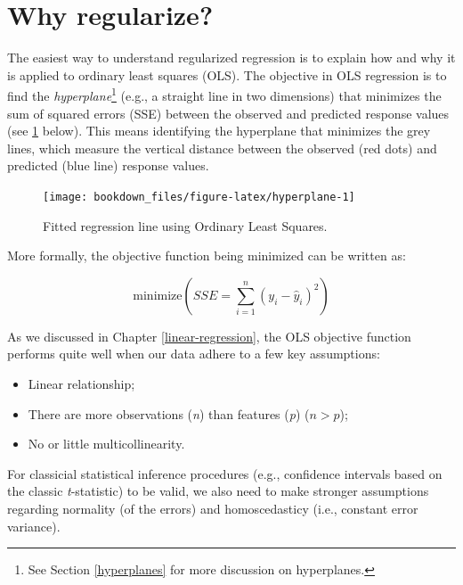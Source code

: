 \documentclass[]{krantz}
\providecommand{\tightlist}{%
  \setlength{\itemsep}{0pt}\setlength{\parskip}{0pt}}
\let\BeginKnitrBlock\begin \let\EndKnitrBlock\end
\begin{document}
\hypertarget{why}{%
\section{Why regularize?}\label{why}}

The easiest way to understand regularized regression is to explain how and why it is applied to ordinary least squares (OLS). The objective in OLS regression is to find the \emph{hyperplane}\footnote{See Section \ref{hyperplanes} for more discussion on hyperplanes.} (e.g., a straight line in two dimensions) that minimizes the sum of squared errors (SSE) between the observed and predicted response values (see \ref{fig:hyperplane} below). This means identifying the hyperplane that minimizes the grey lines, which measure the vertical distance between the observed (red dots) and predicted (blue line) response values.

\begin{figure}

{\centering \texttt{[image: bookdown\_files/figure-latex/hyperplane-1]} 

}

\caption{Fitted regression line using Ordinary Least Squares.}\label{fig:hyperplane}
\end{figure}

More formally, the objective function being minimized can be written as:

\begin{equation}
\label{eq:ols-objective}
\text{minimize} \left( SSE = \sum^n_{i=1} \left(y_i - \hat{y}_i\right)^2 \right)
\end{equation}

As we discussed in Chapter \ref{linear-regression}, the OLS objective function performs quite well when our data adhere to a few key assumptions:

\begin{itemize}
\tightlist
\item
  Linear relationship;
\item
  There are more observations (\emph{n}) than features (\emph{p}) (\(n > p\));
\item
  No or little multicollinearity.
\end{itemize}

\BeginKnitrBlock{note}
For classicial statistical inference procedures (e.g., confidence intervals based on the classic \emph{t}-statistic) to be valid, we also need to make stronger assumptions regarding normality (of the errors) and homoscedasticy (i.e., constant error variance).
\EndKnitrBlock{note}
\end{document}
